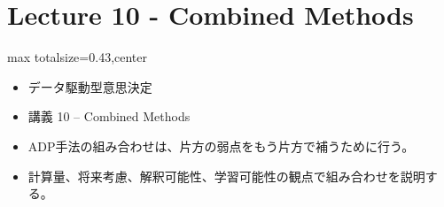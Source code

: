 \section*{Lecture 10 - Combined Methods}

\clearpage
{}
\begin{minipage}[t]{0.405\textwidth}
\begin{adjustbox}{max totalsize={\textwidth}{0.43\textheight},center}
\begin{minipage}{\textwidth}\scriptsize
{}\begin{itemize}
\item データ駆動型意思決定
\item 講義 10 – Combined Methods
\end{itemize}\begin{itemize}
\item ADP手法の組み合わせは、片方の弱点をもう片方で補うために行う。
\item 計算量、将来考慮、解釈可能性、学習可能性の観点で組み合わせを説明する。
\end{itemize}
\end{minipage}
\end{adjustbox}
\end{minipage}\hfill

